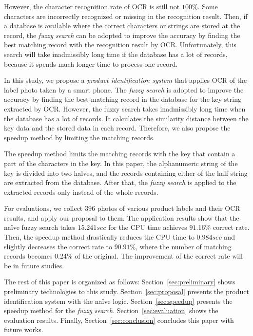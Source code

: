 \documentclass[technicalreport]{ieicej}
\begin{document}
    However, the character recognition rate of OCR is still not $100\%$. Some characters are incorrectly recognized or missing in the recognition result. Then, if a database is available where the correct characters or strings are stored at the record, the {\em fuzzy search} can be adopted to improve the accuracy by finding the best matching record with the recognition result by OCR. Unfortunately, this search will take inadmissibly long time if the database has a lot of records, because it spends much longer time to process one record. 

    In this study, we propose a {\em product identification system} that applies OCR of the label photo taken by a smart phone. The {\em fuzzy search} is adopted to improve the accuracy by finding the best-matching record in the database for the key string extracted by OCR. However, the fuzzy search takes inadmissibly long time when the database has a lot of records. It calculates the similarity distance between the key data and the stored data in each record. Therefore, we also propose the speedup method by limiting the matching records. 

    The speedup method limits the matching records with the key that contain a part of the characters in the key. In this paper, the alphanumeric string of the key is divided into two halves, and the records containing either of the half string are extracted from the database. After that, the {\em fuzzy search} is applied to the extracted records only instead of the whole records. 

    For evaluations, we collect $396$ photos of various product labels and their OCR results, and apply our proposal to them. The application results show that the naïve fuzzy search takes $15.241sec$ for the CPU time achieves $91.16\%$ correct rate. Then, the speedup method drastically reduces the CPU time to $0.984sec$ and slightly decreases the correct rate to $90.91\%$, where the number of matching records becomes 0.24\% of the original. The improvement of the correct rate will be in future studies.

    The rest of this paper is organized as follows:
    Section~\ref{sec:preliminary} shows preliminary technologies to this study.
    Section~\ref{sec:proposal} presents the product identification system with the naïve logic.
    Section~\ref{sec:speedup} presents the speedup method for the {\em fuzzy search}.
    Section~\ref{sec:evaluation} shows the evaluation results.
    Finally, Section~\ref{sec:conclusion} concludes this paper with future works.
\end{document}
